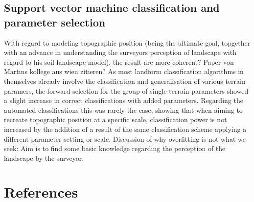 \documentclass[final,1p,times,twocolumn,authoryear]{elsarticle}
\begin{document}
\subsection{Support vector machine classification and parameter selection}
With regard to modeling topographic position (being the ultimate goal, topgether with an advance in understanding the surveyors perception of landscape with regard to his soil landscape model), the result are more coherent? Paper von Martins kollege aus wien zitieren?
As most landform classification algorithms in themselves already involve the classification and generalisation of various terrain paramers, the forward selection for the group of single terrain parameters showed a slight increase in correct classifications with added parameters. Regarding the automated classifications this was rarely the case, showing that when aiming to recreate topographic position at a specific scale, classification power is not increased by the addition of a result of the same classification scheme applying a different parameter setting or scale.
Discussion of why overfitting is not what we seek: Aim is to find some basic knowledge regarding the perception of the landscape by the surveyor.


\clearpage
\section*{References}

\end{document}

